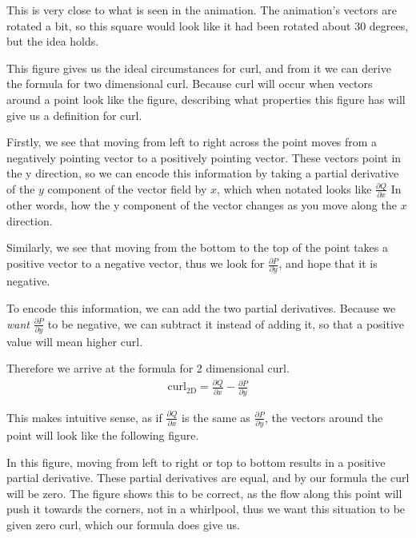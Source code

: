 \documentclass{article}
\begin{document}
    This is very close to what is seen in the animation.
    The animation's vectors are rotated a bit, so this square would look like it had been rotated about 30 degrees, but the idea holds.

    This figure gives us the ideal circumstances for curl, and from it we can derive the formula for two dimensional curl.
    Because curl will occur when vectors around a point look like the figure, describing what properties this figure has will give us a definition for curl.

    Firstly, we see that moving from left to right across the point moves from a negatively pointing vector to a positively pointing vector.
    These vectors point in the y direction, so we can encode this information by taking a partial derivative of the $y$ component of the vector field by $x$, which when notated looks like
    $\frac{\partial Q}{\partial x}$
    In other words, how the y component of the vector changes as you move along the $x$ direction.

    Similarly, we see that moving from the bottom to the top of the point takes a positive vector to a negative vector, thus we look for 
    $\frac{\partial P}{ \partial y}$, and hope that it is negative.
    
    To encode this information, we can add the two partial derivatives.
    Because we \emph{want} $\frac{\partial P}{ \partial y}$ to be negative, we can subtract it instead of adding it, so that a positive value will mean higher curl.

    Therefore we arrive at the formula for 2 dimensional curl.
    \begin{gather*}
        \text{curl}_\text{2D} =  \frac{\partial Q}{\partial x} - \frac{\partial P}{\partial y}
    \end{gather*}

    This makes intuitive sense, as if $\frac{\partial Q}{\partial x}$ is the same as $\frac{\partial P}{\partial y}$, the vectors around the point will look like the following figure.

    \begin{figure}[!h]
        \centering
    \end{figure}
    In this figure, moving from left to right or top to bottom results in a positive partial derivative.
    These partial derivatives are equal, and by our formula the curl will be zero.
    The figure shows this to be correct, as the flow along this point will push it towards the corners, not in a whirlpool, thus we want this situation to be given zero curl, which our formula does give us.
    
\end{document}
